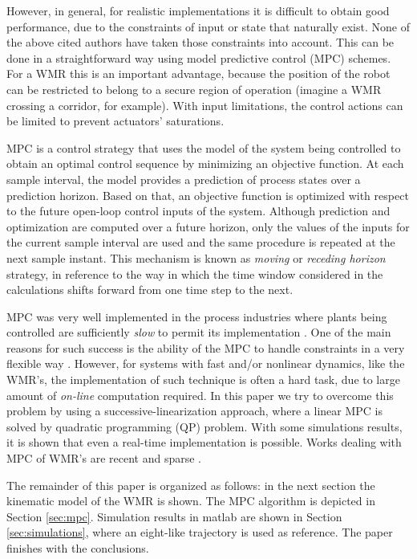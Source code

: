 \documentclass[twocolumn]{IEEEtran} %
\begin{document}
However, in general, for realistic implementations it is difficult to obtain good performance, due to the constraints of input or state that naturally exist. None of the above cited authors have taken those constraints into account. This can be done in a straightforward way using model predictive control (MPC) schemes. For a WMR this is an important advantage, because the position of the robot can be restricted to belong to a secure region of operation (imagine a WMR crossing a corridor, for example). With input limitations, the control actions can be limited to prevent actuators' saturations.

MPC is a control strategy that uses the model of the system being controlled to obtain an optimal control sequence by minimizing an objective function. At each sample interval, the model provides a prediction of process states over a prediction horizon. Based on that, an objective function is optimized with respect to the future open-loop control inputs of the system. Although prediction and optimization are computed over a future horizon, only the values of the inputs for the current sample interval are used and the same procedure is repeated at the next sample instant. This mechanism is known as {\it moving} or {\it receding horizon} strategy, in reference to the way in which the time window considered in the calculations shifts forward from one time step to the next.

MPC was very well implemented in the process industries where plants being controlled are sufficiently {\em slow} to permit its implementation \cite{mayne98,allgower99}. One of the main reasons for such success is the ability of the MPC to handle constraints in a very flexible way \cite{garcia89}. However, for systems with fast and/or nonlinear dynamics, like the WMR's, the implementation of such technique is often a hard task, due to large amount of {\em on-line} computation required. In this paper we try to overcome this problem by using a successive-linearization approach, where a linear MPC is solved by quadratic programming (QP) problem. With some simulations results, it is shown that even a real-time implementation is possible. Works dealing with MPC of WMR's are recent and sparse \cite{ollero91,rico99,essen01}.

The remainder of this paper is organized as follows: in the next section the kinematic model of the WMR is shown. The MPC algorithm is depicted in Section \ref{sec:mpc}. Simulation results in {\sc matlab} are shown in Section \ref{sec:simulations}, where an eight-like trajectory is used as reference. The paper finishes with the conclusions. 
\end{document}
